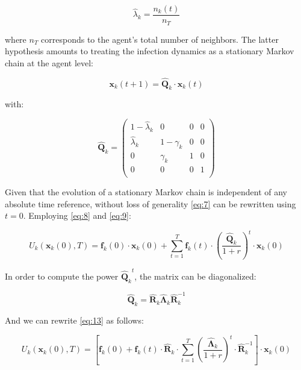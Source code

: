 \documentclass[11pt]{article}
\begin{document}
\begin{equation}\label{eq:10}
 	\hat{\lambda}_{k}=\frac{n_{k}(t)}{n_{T}}
\end{equation}

where \(n_{T}\) corresponds to the agent's total number of neighbors. The latter hypothesis amounts to treating the infection dynamics as a stationary Markov chain at the agent level:

\begin{equation}\label{eq:11}
	 \mathbf{x}_k(t+1) = \hat{\mathbf{Q}}_k \cdot \mathbf{x}_k(t)
\end{equation}

with:

\begin{equation}\label{eq:12}
	 \hat{\mathbf{Q}}_k = 
	 \left (\begin{array}{cccc} 1-\hat{\lambda}_{k}&0&0&0 \\
	 	\hat{\lambda}_{k}&1-\gamma_{k}&0&0 \\
		0&\gamma_{k}&1&0 \\
		0&0&0&1 \\
	  \end{array} \right)
\end{equation}

Given that the evolution of a stationary Markov chain is independent of any absolute time reference, without loss of generality \eqref{eq:7} can be rewritten using $t = 0$. Employing \eqref{eq:8} and \eqref{eq:9}:

\begin{equation}\label{eq:13}
	U_k(\mathbf{x}_k(0), T) = \mathbf{f}_k(0) \cdot \mathbf{x}_k(0) + \sum_{t=1}^{T} {\mathbf{f}_k(t) \cdot   \left(\frac{ \hat{\mathbf{Q}}_k}{1+r}\right)^t \cdot \mathbf{x}_k(0) }
\end{equation}

In order to compute the power \({\hat{\mathbf{Q}}_k}^t\), the matrix can be diagonalized:

\begin{equation}\label{eq:14}
	\hat{\mathbf{Q}}_k=\hat{\mathbf{R}}_{k}\hat{\mathbf{\Lambda}}_{k}\hat{\mathbf{R}}^{-1}_{k}
\end{equation}

And we can rewrite \eqref{eq:13} as follows:

\begin{equation}\label{eq:15}
	U_k(\mathbf{x}_k(0), T)= \left[ \mathbf{f}_k(0) + \mathbf{f}_k(t) \cdot \hat{\mathbf{R}}_{k} \cdot \sum_{t=1}^{T} { \left(\frac{ \hat{\mathbf{\Lambda}}_{k}}{1+r}\right)^t \cdot \hat{\mathbf{R}}^{-1}_{k}} \right] \cdot \mathbf{x}_k(0)
\end{equation}
\end{document}
